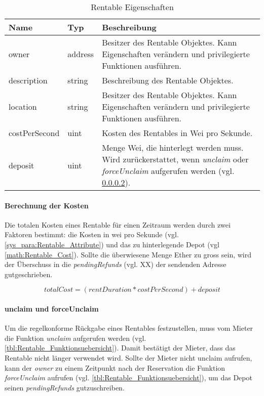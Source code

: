 \begin{longtable}{@{}llL{9cm}@{}}
\caption{Rentable Eigenschaften}\label{tbl:Rentable_Eigenschaften}\\
\toprule
Name & Typ & Beschreibung \\ \midrule
owner & address   & Besitzer des Rentable Objektes. Kann Eigenschaften verändern und privilegierte Funktionen ausführen.\\
description & string   & Beschreibung des Rentable Objektes.\\
location & string   & Besitzer des Rentable Objektes. Kann Eigenschaften verändern und privilegierte Funktionen ausführen.\\
costPerSecond & uint   & Kosten des Rentables in Wei pro Sekunde.\\
deposit & uint   & Menge Wei, die hinterlegt werden muss. Wird zurückerstattet, wenn \emph{unclaim} oder \emph{forceUnclaim} aufgerufen werden (vgl. \ref{sys_para:claim_unclaim}).\\
\end{longtable}

\paragraph{Berechnung der Kosten}
Die totalen Kosten eines Rentable für einen Zeitraum werden durch zwei Faktoren bestimmt: die Kosten in wei pro Sekunde (vgl. \ref{sys_para:Rentable_Attribute}) und das zu hinterlegende Depot (vgl \ref{math:Rentable_Cost}). Sollte die überwiesene Menge Ether zu gross sein, wird der Überschuss in die \emph{pendingRefunds} (vgl. XX) der sendenden Adresse gutgeschrieben.

\begin{equation}
\label{math:Rentable_Cost}
totalCost = (rentDuration * costPerSecond) + deposit
\end{equation}

\paragraph{unclaim und forceUnclaim}
\label{sys_para:claim_unclaim}
Um die regelkonforme Rückgabe eines Rentables festzustellen, muss vom Mieter die Funktion \emph{unclaim} aufgerufen werden (vgl. \ref{tbl:Rentable_Funktionsuebersicht}). Damit bestätigt der Mieter, dass das Rentable nicht länger verwendet wird. Sollte der Mieter nicht unclaim aufrufen, kann der \emph{owner} zu einem Zeitpunkt nach der Reservation die Funktion \emph{forceUnclaim} aufrufen (vgl. \ref{tbl:Rentable_Funktionsuebersicht}), um das Depot seinen \emph{pendingRefunds} gutzuschreiben.

